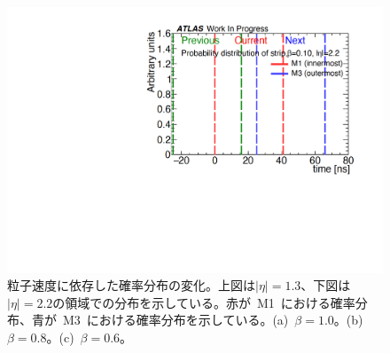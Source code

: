 \begin{figure}[tbp]
\begin{minipage}{0.33\hsize}
    \includegraphics[width=\textwidth,page=7]{img/rec/rec_e2.2_s.pdf}
    \subcaption{}
    \end{minipage}
    \caption[粒子速度に依存した確率分布の変化]{粒子速度に依存した確率分布の変化。上図は$|\eta|=1.3$、下図は$|\eta|=2.2$の領域での分布を示している。赤が~M1~における確率分布、青が~M3~における確率分布を示している。(a)~$\beta=1.0$。(b)~$\beta=0.8$。(c)~$\beta=0.6$。}\label{fig:recbeta}
\end{figure}

